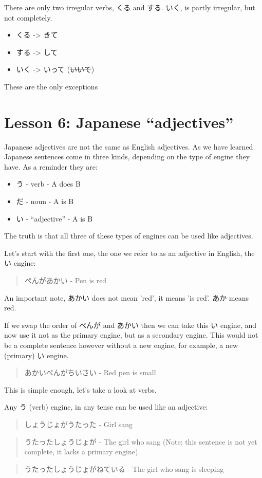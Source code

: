 \documentclass[11pt]{article}
\begin{document}
There are only two irregular verbs, くる and する. いく, is partly irregular, but not completely.
\begin{itemize}
\item くる -> きて
\item する -> して
\item いく -> いって (\sout{いいて})
\end{itemize}
These are the only exceptions
\section{Lesson 6: Japanese ``adjectives''}
\label{sec:org1ed052e}
Japanese adjectives are not the same as English adjectives. As we have learned Japanese sentences come in three kinds, depending on the type of engine they have. As a reminder they are:
\begin{itemize}
\item う - verb - A does B
\item だ - noun - A is B
\item い - ``adjective'' - A is B
\end{itemize}

The truth is that all three of these types of engines can be used like adjectives.

Let's start with the first one, the one we refer to as an adjective in English, the い engine:
\begin{quote}
ぺんがあかい - Pen is red
\end{quote}
An important note, あかい does not mean 'red', it means 'is red'. あか means red.

If we swap the order of ぺんが and あかい then we can take this い engine, and now use it not as the primary engine, but as a secondary engine. This would not be a complete sentence however without a new engine, for example, a new (primary) い engine.
\begin{quote}
あかいぺんがちいさい - Red pen is small
\end{quote}
This is simple enough, let's take a look at verbs.

Any う (verb) engine, in any tense can be used like an adjective:
\begin{quote}
しょうじょがうたった - Girl sang
\end{quote}
\begin{quote}
うたったしょうじょが - The girl who sang (Note: this sentence is not yet complete, it lacks a primary engine).
\end{quote}
\begin{quote}
うたったしょうじょがねている - The girl who sang is sleeping
\end{quote}
\end{document}
